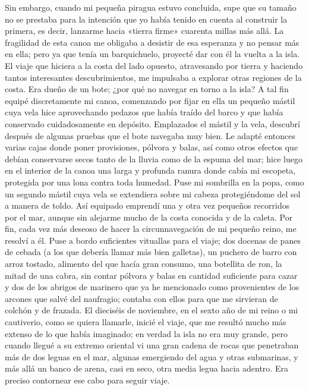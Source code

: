 \documentclass{novela}
\begin{document}
    Sin embargo, cuando mi pequeña piragua estuvo concluida, supe que su tamaño no se prestaba para la intención que yo había tenido en cuenta al construir la primera, es decir, lanzarme hacia «tierra firme» cuarenta millas más allá. La fragilidad de esta canoa me obligaba a desistir de esa esperanza y no pensar más en ella; pero ya que tenía un barquichuelo, proyecté dar con él la vuelta a la isla. El viaje que hiciera a la costa del lado opuesto, atravesando por tierra y haciendo tantos interesantes descubrimientos, me impulsaba a explorar otras regiones de la costa. Era dueño de un bote; ¿por qué no navegar en torno a la isla?
    A tal fin equipé discretamente mi canoa, comenzando por fijar en ella un pequeño mástil cuya vela hice aprovechando pedazos que había traído del barco y que había conservado cuidadosamente en depósito.
    Emplazados el mástil y la vela, descubrí después de algunas pruebas que el bote navegaba muy bien. Le adapté entonces varias cajas donde poner provisiones, pólvora y balas, así como otros efectos que debían conservarse secos tanto de la lluvia como de la espuma del mar; hice luego en el interior de la canoa una larga y profunda ranura donde cabía mi escopeta, protegida por una lona contra toda humedad.
    Puse mi sombrilla en la popa, como un segundo mástil cuya vela se extendiera sobre mi cabeza protegiéndome del sol a manera de toldo. Así equipado emprendí una y otra vez pequeños recorridos por el mar, aunque sin alejarme mucho de la costa conocida y de la caleta. Por fin, cada vez más deseoso de hacer la circunnavegación de mi pequeño reino, me resolví a él. Puse a bordo suficientes vituallas para el viaje; dos docenas de panes de cebada (a los que debería llamar más bien galletas), un puchero de barro con arroz tostado, alimento del que hacía gran consumo, una botellita de ron, la mitad de una cabra, sin contar pólvora y balas en cantidad suficiente para cazar y dos de los abrigos de marinero que ya he mencionado como provenientes de los arcones que salvé del naufragio; contaba con ellos para que me sirvieran de colchón y de frazada.
    El dieciséis de noviembre, en el sexto año de mi reino o mi cautiverio, como se quiera llamarle, inicié el viaje, que me resultó mucho más extenso de lo que había imaginado; en verdad la isla no era muy grande, pero cuando llegué a su extremo oriental vi una gran cadena de rocas que penetraban más de dos leguas en el mar, algunas emergiendo del agua y otras submarinas, y más allá un banco de arena, casi en seco, otra media legua hacia adentro. Era preciso contornear ese cabo para seguir viaje.
\end{document}
